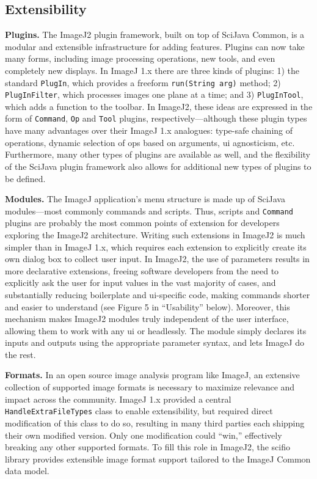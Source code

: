 \documentclass{bmcart}
\begin{document}
\subsection*{Extensibility}

\textbf{Plugins.} The ImageJ2 plugin framework, built on top of SciJava Common,
is a modular and extensible infrastructure for adding features. Plugins can now
take many forms, including image processing operations, new tools, and even
completely new displays. In ImageJ 1.x there are three kinds of plugins: 1) the
standard \texttt{PlugIn}, which provides a freeform \texttt{run(String arg)}
method; 2) \texttt{PlugInFilter}, which processes images one plane at a time;
and 3) \texttt{PlugInTool}, which adds a function to the toolbar. In ImageJ2,
these ideas are expressed in the form of \texttt{Command}, \texttt{Op} and
\texttt{Tool} plugins, respectively---although these plugin types have many
advantages over their ImageJ 1.x analogues: type-safe chaining of operations,
dynamic selection of ops based on arguments, \acrshort{ui} agnosticism, etc.
Furthermore, many other types of plugins are available as well, and the
flexibility of the SciJava plugin framework also allows for additional new
types of plugins to be defined.

\textbf{Modules.} The ImageJ application's menu structure is made up of SciJava
modules---most commonly commands and scripts. Thus, scripts and
\texttt{Command} plugins are probably the most common points of extension for
developers exploring the ImageJ2 architecture. Writing such extensions in
ImageJ2 is much simpler than in ImageJ 1.x, which requires each extension to
explicitly create its own dialog box to collect user input. In ImageJ2, the use
of parameters results in more declarative extensions, freeing software
developers from the need to explicitly ask the user for input values in the
vast majority of cases, and substantially reducing boilerplate and
\acrshort{ui}-specific code, making commands shorter and easier to understand
(see Figure 5 in ``Usability'' below). Moreover, this mechanism makes ImageJ2
modules truly independent of the user interface, allowing them to work with any
\acrshort{ui} or headlessly. The module simply declares its inputs and outputs
using the appropriate parameter syntax, and lets ImageJ do the rest.

\textbf{Formats.} In an open source image analysis program like ImageJ, an
extensive collection of supported image formats is necessary to maximize
relevance and impact across the community. ImageJ 1.x provided a central
\texttt{HandleExtraFileTypes} class to enable extensibility, but required
direct modification of this class to do so, resulting in many third parties
each shipping their own modified version. Only one modification could ``win,''
effectively breaking any other supported formats. To fill this role in ImageJ2,
the \acrfull{scifio} library provides extensible image format support tailored
to the ImageJ Common data model.
\end{document}
